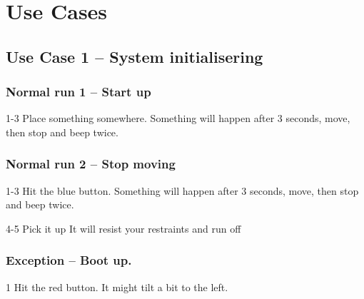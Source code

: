 \documentclass[Main]{subfiles}
\begin{document}
\chapter{Use Cases}

\section{Use Case 1 -- System initialisering}

\subsection*{Normal run 1 -- Start up}
\vspace{-10pt}
\begin{TestCaseIntro}
\end{TestCaseIntro}

\vspace{-10pt}
\begin{TestCase}
\TC
{1-3}
{Place something somewhere.}
{Something will happen after 3 seconds, move, then stop and beep twice.}
{}
\end{TestCase}







\subsection*{Normal run 2 -- Stop moving}
\vspace{-10pt}
\begin{TestCaseIntro}
\end{TestCaseIntro}

\vspace{-10pt}
\begin{TestCase}
\TC
{1-3}
{Hit the blue button.}
{Something will happen after 3 seconds, move, then stop and beep twice.}
{}

\TC
{4-5}
{Pick it up}
{It will resist your restraints and run off}
{}
\end{TestCase}





\subsection*{Exception -- Boot up.}
\vspace{-10pt}

\begin{TestCaseIntro}
\end{TestCaseIntro}

\vspace{-10pt}
\begin{TestCase}
\TC
{1}
{Hit the red button.}
{It might tilt a bit to the left.}
{}
\end{TestCase}
\end{document}

